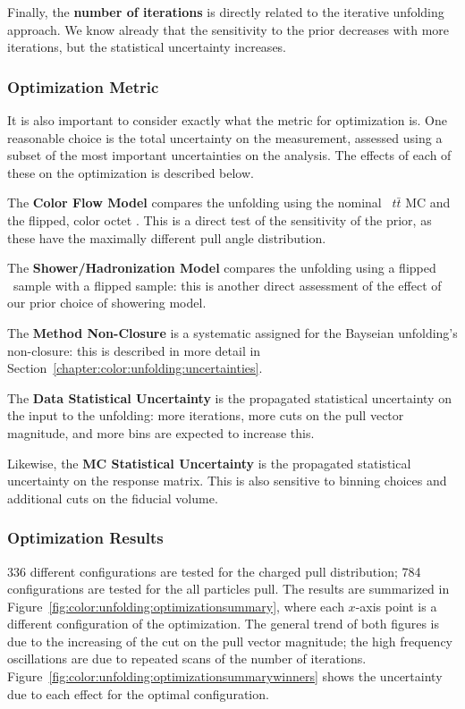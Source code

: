 	Finally, the \textbf{number of iterations} is directly related to the iterative unfolding approach. We know already that the sensitivity to the prior decreases  with more iterations, but the statistical uncertainty increases.

	\subsubsection{Optimization Metric}

	It is also important to consider exactly what the metric for optimization is. One reasonable choice is the total uncertainty on the measurement, assessed using a subset of the most important uncertainties on the analysis. The effects of each of these on the optimization is described below.

	The \textbf{Color Flow Model} compares the unfolding using the nominal \PowPythia\ $t\bar{t}$ MC and the flipped, color octet \PowPythia. This is a direct test of the sensitivity of the prior, as these have the maximally different pull angle distribution.

	The \textbf{Shower/Hadronization Model} compares the unfolding using a flipped \PowPythia\ sample with a flipped \PowHerwig sample: this is another direct assessment of the effect of our prior choice of showering model. 

	The \textbf{Method Non-Closure} is a systematic assigned for the Bayseian unfolding's non-closure: this is described in more detail in Section~\ref{chapter:color:unfolding:uncertainties}.

	The \textbf{Data Statistical Uncertainty} is the propagated statistical uncertainty on the input to the unfolding: more iterations, more cuts on the pull vector magnitude, and more bins are expected to increase this.

	Likewise, the \textbf{MC Statistical Uncertainty} is the propagated statistical uncertainty on the response matrix. This is also sensitive to binning choices and additional cuts on the fiducial volume.

	\subsubsection{Optimization Results}

	336 different configurations are tested for the charged pull distribution; 784 configurations are tested for the all particles pull. The results are summarized in Figure~\ref{fig:color:unfolding:optimizationsummary}, where each $x$-axis point is a different configuration of the optimization. The general trend of both figures is due to the increasing of the cut on the pull vector magnitude; the high frequency oscillations are due to repeated scans of the number of iterations. Figure~\ref{fig:color:unfolding:optimizationsummarywinners} shows the uncertainty due to each effect for the optimal configuration.

